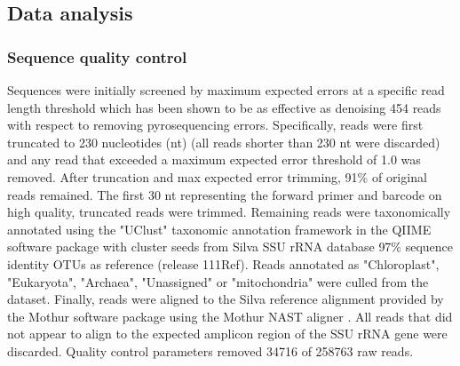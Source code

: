 \subsection{Data analysis} 

\subsubsection{Sequence quality control} Sequences were initially screened by
maximum expected errors at a specific read length threshold \citep{23955772}
which has been shown to be as effective as denoising 454 reads with respect to
removing pyrosequencing errors. Specifically, reads were first truncated to 230
nucleotides (nt) (all reads shorter than 230 nt were discarded) and any read that
exceeded a maximum expected error threshold of 1.0 was removed. After
truncation and max
expected error trimming, 91\% of original reads remained. The first 30 nt
representing the forward primer and barcode on high quality, truncated reads
were trimmed. Remaining reads were taxonomically annotated using the "UClust"
taxonomic annotation framework in the QIIME software package \citep{20383131,
20709691} with cluster seeds from Silva SSU rRNA database \citep{17947321} 97\%
sequence identity OTUs as reference (release 111Ref). Reads annotated as
"Chloroplast", "Eukaryota", "Archaea", "Unassigned" or "mitochondria" were
culled from the dataset. Finally, reads were aligned to the Silva reference
alignment provided by the Mothur software package \citep{19801464} using the
Mothur NAST aligner \citep{16845035}. All reads that did not appear to align to
the expected amplicon region of the SSU rRNA gene were discarded. Quality
control parameters removed 34716 of 258763 raw reads.

